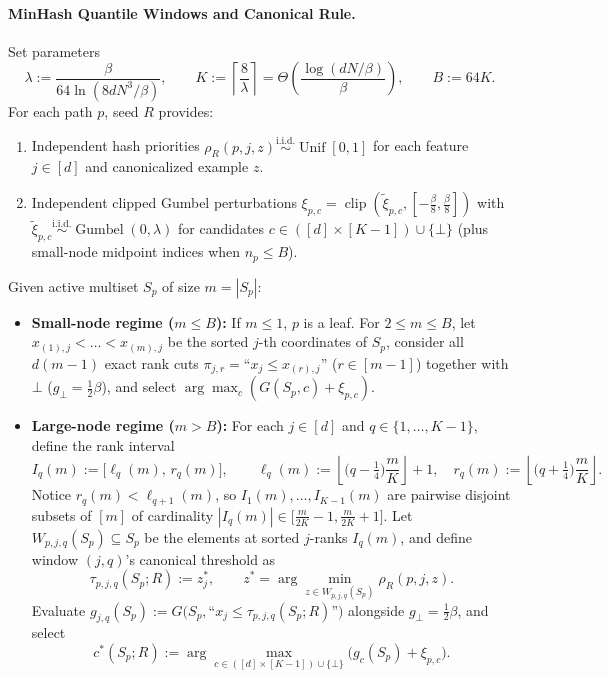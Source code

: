\documentclass[11pt]{article}
\theoremstyle{definition}
\newcommand{\Unif}{\operatorname{Unif}}
\newcommand{\Gumbel}{\operatorname{Gumbel}}
\newcommand{\clip}{\operatorname{clip}}
\begin{document}
\paragraph{MinHash Quantile Windows and Canonical Rule.}
Set parameters
\[
    \lambda := \frac{\beta}{64 \ln(8 d N^3 / \beta)}, \qquad K := \left\lceil \frac{8}{\lambda} \right\rceil = \Theta\left(\frac{\log(dN/\beta)}{\beta}\right), \qquad B := 64 K.
\]
For each path $p$, seed $R$ provides:
\begin{enumerate}[leftmargin=1.5em,itemsep=2pt]
    \item Independent hash priorities $\rho_R(p, j, z) \stackrel{\text{i.i.d.}}{\sim} \Unif[0, 1]$ for each feature $j \in [d]$ and canonicalized example $z$.
    \item Independent clipped Gumbel perturbations $\xi_{p, c} = \clip(\tilde{\xi}_{p, c}, [-\frac{\beta}{8}, \frac{\beta}{8}])$ with $\tilde{\xi}_{p, c} \stackrel{\text{i.i.d.}}{\sim} \Gumbel(0, \lambda)$ for candidates $c \in ([d] \times [K-1]) \cup \{\bot\}$ (plus small-node midpoint indices when $n_p \le B$).
\end{enumerate}

Given active multiset $S_p$ of size $m = |S_p|$:
\begin{itemize}[leftmargin=1.5em,itemsep=2pt]
    \item \textbf{Small-node regime ($m \le B$):} If $m \le 1$, $p$ is a leaf. For $2 \le m \le B$, let $x_{(1), j} < \dots < x_{(m), j}$ be the sorted $j$-th coordinates of $S_p$, consider all $d(m-1)$ exact rank cuts $\pi_{j, r} = \text{``}x_j \le x_{(r), j}\text{''}$ ($r \in [m-1]$) together with $\bot$ ($g_\bot = \frac{1}{2}\beta$), and select $\arg\max_c (G(S_p, c) + \xi_{p, c})$.
    \item \textbf{Large-node regime ($m > B$):} For each $j \in [d]$ and $q \in \{1, \dots, K-1\}$, define the rank interval
    \[
        I_q(m) := \big[\ell_q(m), \, r_q(m)\big], \qquad \ell_q(m) := \left\lfloor \Big(q - \tfrac{1}{4}\Big)\frac{m}{K} \right\rfloor + 1, \quad r_q(m) := \left\lfloor \Big(q + \tfrac{1}{4}\Big)\frac{m}{K} \right\rfloor.
    \]
    Notice $r_q(m) < \ell_{q+1}(m)$, so $I_1(m), \dots, I_{K-1}(m)$ are pairwise disjoint subsets of $[m]$ of cardinality $|I_q(m)| \in \big[\frac{m}{2K} - 1, \frac{m}{2K} + 1\big]$. Let $W_{p, j, q}(S_p) \subseteq S_p$ be the elements at sorted $j$-ranks $I_q(m)$, and define window $(j,q)$'s canonical threshold as
    \[
        \tau_{p, j, q}(S_p; R) := z^*_j, \qquad z^* = \arg\min_{z \in W_{p, j, q}(S_p)} \rho_R(p, j, z).
    \]
    Evaluate $g_{j, q}(S_p) := G\big(S_p, \text{``}x_j \le \tau_{p, j, q}(S_p; R)\text{''}\big)$ alongside $g_\bot = \frac{1}{2}\beta$, and select
    \[
        c^*(S_p; R) := \arg\max_{c \in ([d] \times [K-1]) \cup \{\bot\}} \big(g_c(S_p) + \xi_{p, c}\big).
    \]
\end{itemize}
\end{document}
